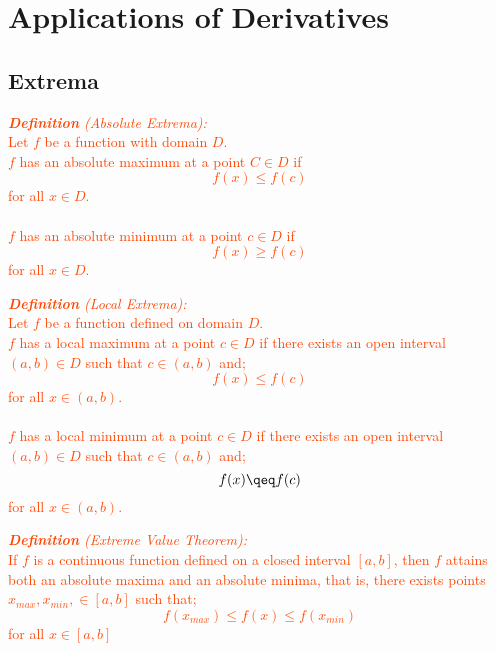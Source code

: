 \documentclass{report}
\newenvironment{definition}[1][OrangeRed]
  {\begin{tcolorbox}[colframe=#1,colback=white]}
  {\end{tcolorbox}}
\begin{document}
\chapter{Applications of Derivatives}
\section{Extrema}

\begin{definition}
    \textcolor{OrangeRed}{\textit{\textbf{Definition} (Absolute Extrema):}\\
     Let $f$ be a function with domain $D$.\\
     $f$ has an absolute maximum at a point $C \in D$ if
     \begin{equation}
         f(x) \leq f(c)
     \end{equation}
     for all $x \in D$.\\
     \textcolor{White}{1}\\
     $f$ has an absolute minimum at a point $c \in D$ if
     \begin{equation}
         f(x) \geq f(c)
     \end{equation}
     for all $x \in D$.}
\end{definition}

\begin{definition}
    \textcolor{OrangeRed}{\textit{\textbf{Definition} (Local Extrema):}\\
    Let $f$ be a function defined on domain $D$.\\
    $f$ has a local maximum at a point $c \in D$ if there exists an open interval $(a,b) \in D$ such that $c \in (a,b)$ and;
    \begin{equation}
        f(x) \leq f(c)
    \end{equation}
    for all $x \in (a,b)$.\\
    \textcolor{White}{1}\\
    $f$ has a local minimum at a point $c \in D$ if there exists an open interval $(a,b) \in D$ such that $c \in (a,b)$ and;
    \begin{equation}
        f(x) \qeq f(c)
    \end{equation}
    for all $x \in (a,b)$.}
\end{definition}

\begin{definition}
    \textcolor{OrangeRed}{\textit{\textbf{Definition} (Extreme Value Theorem):}\\
    If $f$ is a continuous function defined on a closed interval $[a,b]$, then $f$ attains both an absolute maxima and an absolute minima, that is, there exists points $x_{max}, x_{min}, \in [a,b]$ such that;
    \begin{equation}
        f(x_{max}) \leq f(x) \leq f(x_{min})
    \end{equation}
    for all $x \in [a,b]$}
\end{definition}
\end{document}
